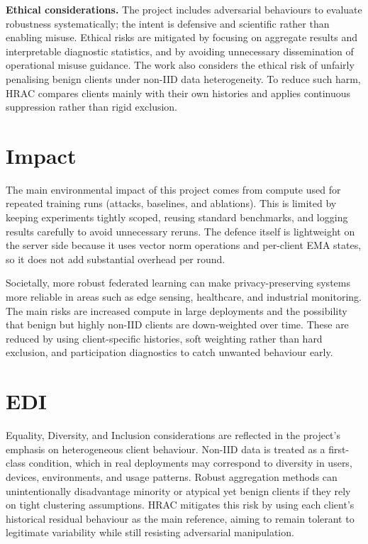 \smallskip

\textbf{Ethical considerations.}
The project includes adversarial behaviours to evaluate robustness systematically; the intent is defensive and scientific rather than enabling misuse. Ethical risks are mitigated by focusing on aggregate results and interpretable diagnostic statistics, and by avoiding unnecessary dissemination of operational misuse guidance. The work also considers the ethical risk of unfairly penalising benign clients under non-IID data heterogeneity. To reduce such harm, HRAC compares clients mainly with their own histories and applies continuous suppression rather than rigid exclusion.

\section{Impact}

The main environmental impact of this project comes from compute used for repeated training runs (attacks, baselines, and ablations). This is limited by keeping experiments tightly scoped, reusing standard benchmarks, and logging results carefully to avoid unnecessary reruns. The defence itself is lightweight on the server side because it uses vector norm operations and per-client EMA states, so it does not add substantial overhead per round.

Societally, more robust federated learning can make privacy-preserving systems more reliable in areas such as edge sensing, healthcare, and industrial monitoring. The main risks are increased compute in large deployments and the possibility that benign but highly non-IID clients are down-weighted over time. These are reduced by using client-specific histories, soft weighting rather than hard exclusion, and participation diagnostics to catch unwanted behaviour early.

\section{EDI}

Equality, Diversity, and Inclusion considerations are reflected in the project's emphasis on heterogeneous client behaviour. Non-IID data is treated as a first-class condition, which in real deployments may correspond to diversity in users, devices, environments, and usage patterns. Robust aggregation methods can unintentionally disadvantage minority or atypical yet benign clients if they rely on tight clustering assumptions. HRAC mitigates this risk by using each client's historical residual behaviour as the main reference, aiming to remain tolerant to legitimate variability while still resisting adversarial manipulation.

